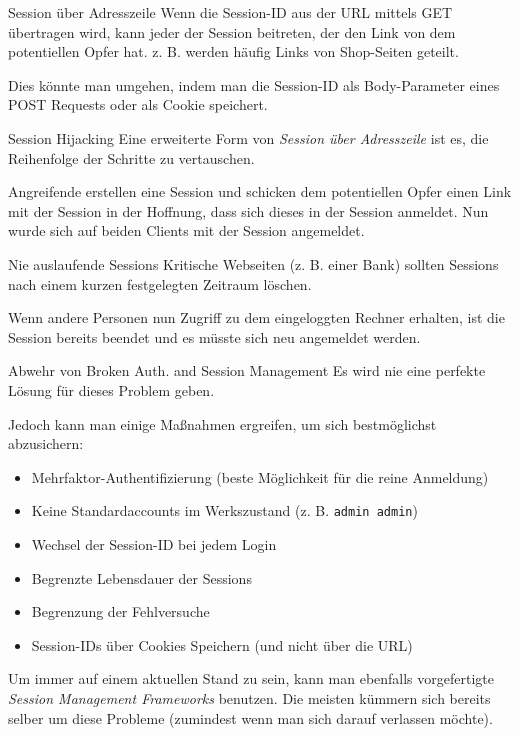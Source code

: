 \begin{example}{Session über Adresszeile}
    Wenn die Session-ID aus der URL mittels GET übertragen wird, kann jeder der Session beitreten, der den Link von dem potentiellen Opfer hat.
    z. B. werden häufig Links von Shop-Seiten geteilt.

    Dies könnte man umgehen, indem man die Session-ID als Body-Parameter eines POST Requests oder als Cookie speichert.
\end{example}

\begin{example}{Session Hijacking}
    Eine erweiterte Form von \emph{Session über Adresszeile} ist es, die Reihenfolge der Schritte zu vertauschen.

    Angreifende erstellen eine Session und schicken dem potentiellen Opfer einen Link mit der Session in der Hoffnung, dass sich dieses in der Session anmeldet.
    Nun wurde sich auf beiden Clients mit der Session angemeldet.
\end{example}

\begin{example}{Nie auslaufende Sessions}
    Kritische Webseiten (z. B. einer Bank) sollten Sessions nach einem kurzen festgelegten Zeitraum löschen.

    Wenn andere Personen nun Zugriff zu dem eingeloggten Rechner erhalten, ist die Session bereits beendet und es müsste sich neu angemeldet werden.
\end{example}

\begin{bonus}{Abwehr von Broken Auth. and Session Management}
    Es wird nie eine perfekte Lösung für dieses Problem geben.

    Jedoch kann man einige Maßnahmen ergreifen, um sich bestmöglichst abzusichern:
    \begin{itemize}
        \item Mehrfaktor-Authentifizierung (beste Möglichkeit für die reine Anmeldung)
        \item Keine Standardaccounts im Werkszustand (z. B. \texttt{admin admin})
        \item Wechsel der Session-ID bei jedem Login
        \item Begrenzte Lebensdauer der Sessions
        \item Begrenzung der Fehlversuche
        \item Session-IDs über Cookies Speichern (und nicht über die URL)
    \end{itemize}

    Um immer auf einem aktuellen Stand zu sein, kann man ebenfalls vorgefertigte \emph{Session Management Frameworks} benutzen.
    Die meisten kümmern sich bereits selber um diese Probleme (zumindest wenn man sich darauf verlassen möchte).
\end{bonus}

